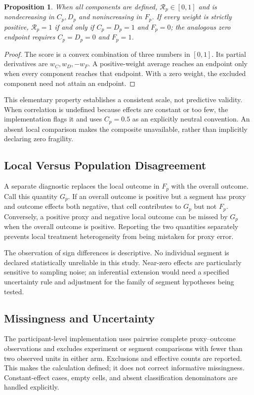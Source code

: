 \documentclass{ieeeaccess}
\newtheorem{proposition}{Proposition}
\newcommand{\Rscore}{\mathcal{R}}
\begin{document}
\begin{proposition}
When all components are defined, $\Rscore_p\in[0,1]$ and is nondecreasing in $C_p,D_p$ and nonincreasing in $F_p$. If every weight is strictly positive, $\Rscore_p=1$ if and only if $C_p=D_p=1$ and $F_p=0$; the analogous zero endpoint requires $C_p=D_p=0$ and $F_p=1$.
\end{proposition}
\begin{proof}
The score is a convex combination of three numbers in $[0,1]$. Its partial derivatives are $w_C,w_D,-w_F$. A positive-weight average reaches an endpoint only when every component reaches that endpoint. With a zero weight, the excluded component need not attain an endpoint.
\end{proof}
This elementary property establishes a consistent scale, not predictive validity. When correlation is undefined because effects are constant or too few, the implementation flags it and uses $C_p=0.5$ as an explicitly neutral convention. An absent local comparison makes the composite unavailable, rather than implicitly declaring zero fragility.

\subsection{Local Versus Population Disagreement}
A separate diagnostic replaces the local outcome in $F_p$ with the overall outcome. Call this quantity $G_p$. If an overall outcome is positive but a segment has proxy and outcome effects both negative, that cell contributes to $G_p$ but not $F_p$. Conversely, a positive proxy and negative local outcome can be missed by $G_p$ when the overall outcome is positive. Reporting the two quantities separately prevents local treatment heterogeneity from being mistaken for proxy error.

The observation of sign differences is descriptive. No individual segment is declared statistically unreliable in this study. Near-zero effects are particularly sensitive to sampling noise; an inferential extension would need a specified uncertainty rule and adjustment for the family of segment hypotheses being tested.

\subsection{Missingness and Uncertainty}
The participant-level implementation uses pairwise complete proxy--outcome observations and excludes experiment or segment comparisons with fewer than two observed units in either arm. Exclusions and effective counts are reported. This makes the calculation defined; it does not correct informative missingness. Constant-effect cases, empty cells, and absent classification denominators are handled explicitly.
\end{document}
